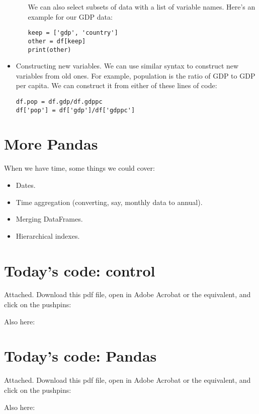 \documentclass[11pt]{article}
\begin{document}
\begin{itemize}
\begin{itemize}
We can also select subsets of data with a list of variable names.
Here's an example for our GDP data:
\begin{verbatim}
keep = ['gdp', 'country']
other = df[keep]
print(other)
\end{verbatim}
\end{itemize}

\item Constructing new variables.
We can use similar syntax to construct new variables from old ones.
For example, population is the ratio of GDP to GDP per capita.
We can construct it from either of these lines of code:
\begin{verbatim}
df.pop = df.gdp/df.gdppc
df['pop'] = df['gdp']/df['gdppc']
\end{verbatim}


\end{itemize}


\section{More Pandas}


When we have time, some things we could cover:
\begin{itemize}
\item Dates.
\item Time aggregation (converting, say, monthly data to annual).

\item Merging DataFrames.

\item Hierarchical indexes.

\end{itemize}




\section*{Today's code:  control}

Attached.  Download this pdf file, open in Adobe Acrobat or the equivalent,
and click on the pushpins:

Also here:
{\small

}

\section*{Today's code:  Pandas}

Attached.  Download this pdf file, open in Adobe Acrobat or the equivalent,
and click on the pushpins:

Also here:
{\small

}
\end{document}
